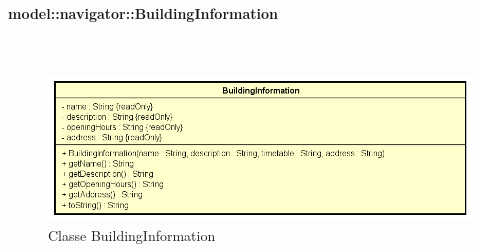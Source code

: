 \documentclass[../DefinizioneDiProdotto.tex]{subfiles}
\begin{document}
\paragraph{model::navigator::BuildingInformation}
\
\begin{figure}[H]
	\centering
	\includegraphics[width=\maxwidth]{img/BuildingInformation.png}
	\caption{Classe BuildingInformation}\label{fig:model::navigator::BuildingInformation} 
\end{figure}
\end{document}
